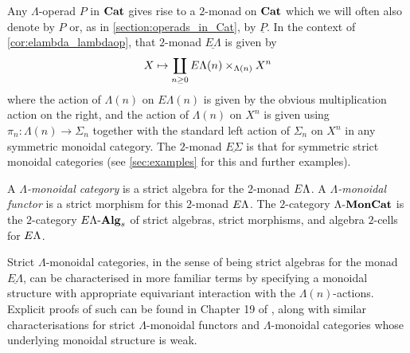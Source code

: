 Any $\Lambda$-operad $P$ in $\mathbf{Cat}$ gives rise to a $2$-monad on $\mathbf{Cat}$ which we will often also denote by $P$ or, as in \cref{section:operads_in_Cat}, by $\underline{P}$. In the context of \cref{cor:elambda_lambdaop}, that $2$-monad $\underline{E\Lambda}$ is given by
  \[
    X \mapsto \coprod_{n \geq 0} E\Lambda(n) \times_{\Lambda(n)} X^{n}
  \]
where the action of $\Lambda(n)$ on $E\Lambda(n)$ is given by the obvious multiplication action on the right, and the action of $\Lambda(n)$ on $X^{n}$ is given using $\pi_{n} \colon \Lambda(n) \rightarrow \Sigma_{n}$ together with the standard left action of $\Sigma_{n}$ on $X^{n}$ in any symmetric monoidal category. The $2$-monad $\underline{E\Sigma}$ is that for symmetric strict monoidal categories (see \cref{sec:examples} for this and further examples).

\begin{Defi}\label{lmc}
A \emph{$\Lambda$-monoidal category} is a strict algebra for the $2$-monad $E\Lambda$. A \emph{$\Lambda$-monoidal functor} is a strict morphism for this $2$-monad $E\Lambda$. The $2$-category $\Lambda\mbox{-}\mathbf{MonCat}$ is the $2$-category $E\Lambda\mbox{-}\mathbf{Alg}_{s}$ of strict algebras, strict morphisms, and algebra $2$-cells for $E\Lambda$.
\end{Defi}


Strict $\Lambda$-monoidal categories, in the sense of being strict algebras for the monad $\underline{E\Lambda}$, can be characterised in more familiar terms by specifying a monoidal structure with appropriate equivariant interaction with the $\Lambda(n)$-actions. Explicit proofs of such can be found in Chapter 19 of \cite{yau_infinity_2021}, along with similar characterisations for strict $\Lambda$-monoidal functors and $\Lambda$-monoidal categories whose underlying monoidal structure is weak.

